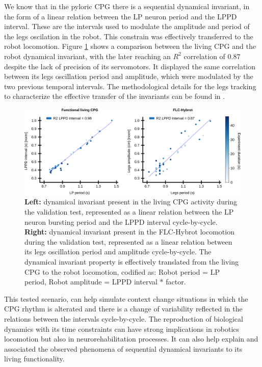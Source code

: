 We know that in the pyloric CPG there is a sequential dynamical invariant, in the form of a linear relation between the LP neuron period and the LPPD interval. These are the intervals used to modulate the amplitude and period of the legs oscilation in the robot. This constrain was effectively transferred to the robot locomotion. Figure \ref{fig:robot_results_invariant} shows a comparison between the living CPG and the robot dynamical invariant, with the later reaching an $R^2$ correlation of 0.87 despite the lack of precision of its servomotors. It displayed the same correlation between its legs oscillation period and amplitude, which were modulated by the two previous temporal intervals. The methodological details for the legs tracking to characterize the effective transfer of the invariants can be found in \textcite{swarc_realtime_2023}.

\begin{figure}[hbt!]
	\begin{center}
		\includegraphics[width=\linewidth]{./img/invariants/robot/robot_results_invariant}
	\end{center}
	\caption{\textbf{Left:} dynamical invariant present in the living CPG activity during the validation test, represented as a linear relation between the LP neuron bursting period and the LPPD interval cycle-by-cycle. \textbf{Right:} dynamical invariant present in the FLC-Hybrot locomotion during the validation test, represented as a linear relation between its legs oscillation period and amplitude cycle-by-cycle. The dynamical invariant property is effectively translated from the living CPG to the robot locomotion, codified as: Robot period = LP period, Robot amplitude = LPPD interval * factor.}
	\label{fig:robot_results_invariant}
\end{figure}

This tested scenario, can help simulate context change situations in which the CPG rhythm is alterated and there is a change of variability reflected in the relations between the intervals cycle-by-cycle. The reproduction of biological dynamics with its time constraints can have strong implications in robotics locomotion but also in neurorehabilitation processes. It can also help explain and associated the observed phenomena of sequential dynamical invariants to its living functionality.
